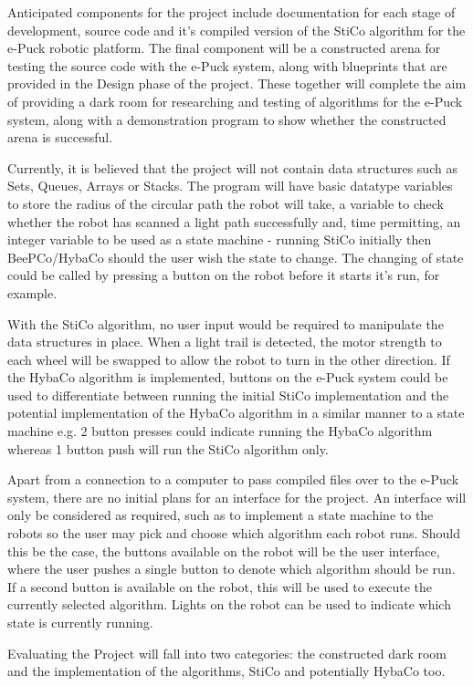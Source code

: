 Anticipated components for the project include documentation for each stage of
development, source code and it's compiled version of the StiCo algorithm for
the e-Puck robotic platform.  The final component will be a constructed arena
for testing the source code with the e-Puck system, along with blueprints that
are provided in the Design phase of the project.  These together will complete
the aim of providing a dark room for researching and testing of algorithms for
the e-Puck system, along with a demonstration program to show whether the 
constructed arena is successful.

Currently, it is believed that the project will not contain data structures
such as Sets, Queues, Arrays or Stacks.  The program will have basic datatype
variables to store the radius of the circular path the robot will take, a 
variable to check whether the robot has scanned a light path successfully and,
time permitting, an integer variable to be used as a state machine - running
StiCo initially then BeePCo/HybaCo should the user wish the state to change.
The changing of state could be called by pressing a button on the robot before
it starts it's run, for example.

With the StiCo algorithm, no user input would be required to manipulate the
data structures in place.  When a light trail is detected, the motor strength
to each wheel will be swapped to allow the robot to turn in the other 
direction.  If the HybaCo algorithm is implemented, buttons on the e-Puck 
system could be used to differentiate between running the initial StiCo
implementation and the potential implementation of the HybaCo algorithm in a
similar manner to a state machine e.g. 2 button presses could indicate running
the HybaCo algorithm whereas 1 button push will run the StiCo algorithm only.

Apart from a connection to a computer to pass compiled files over to the e-Puck
system, there are no initial plans for an interface for the project.  An 
interface will only be considered as required, such as to implement a state
machine to the robots so the user may pick and choose which algorithm each
robot runs.  Should this be the case, the buttons available on the robot will 
be the user interface, where the user pushes a single button to denote which
algorithm should be run.  If a second button is available on the robot, this
will be used to execute the currently selected algorithm.  Lights on the robot
can be used to indicate which state is currently running.

Evaluating the Project will fall into two categories:  the constructed dark
room and the implementation of the algorithms, StiCo and potentially HybaCo
too.
